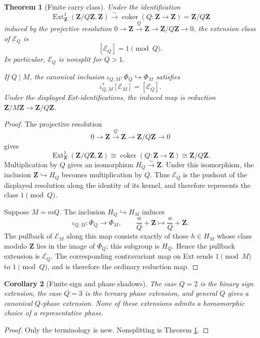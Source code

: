 \documentclass[11pt]{amsart}
\numberwithin{equation}{section}
\newtheorem{theorem}{Theorem}[section]
\newtheorem{corollary}[theorem]{Corollary}
\theoremstyle{definition}
\newcommand{\Z}{\mathbf Z}
\newcommand{\Ext}{\operatorname{Ext}}
\begin{document}
\begin{theorem}[Finite carry class]
\label{thm:finite-carry-class}
Under the identification
\[
\Ext^1_{\Z}(\Z/Q\Z,\Z)
\xrightarrow{\ \sim\ }
\operatorname{coker}(Q:\Z\to\Z)
=\Z/Q\Z
\]
induced by the projective resolution
$0\to\Z\xrightarrow{Q}\Z\to\Z/Q\Z\to0$,
the extension class of $\mathcal E_Q$ is
\[
[\mathcal E_Q]=1\pmod Q.
\]
In particular, $\mathcal E_Q$ is nonsplit for $Q>1$.

If $Q\mid M$, the canonical inclusion
$\iota_{Q,M}:\Phi_Q\hookrightarrow\Phi_M$ satisfies
\[
\iota_{Q,M}^{*}[\mathcal E_M]=[\mathcal E_Q].
\]
Under the displayed Ext-identifications, the induced map is reduction
$\Z/M\Z\to\Z/Q\Z$.
\end{theorem}

\begin{proof}
The projective resolution
\[
0\longrightarrow\Z\xrightarrow{\,Q\,}\Z
\longrightarrow\Z/Q\Z\longrightarrow0
\]
gives
\[
\Ext^1_{\Z}(\Z/Q\Z,\Z)
\cong\operatorname{coker}(Q:\Z\to\Z)
\cong\Z/Q\Z.
\]
Multiplication by $Q$ gives an isomorphism $H_Q\xrightarrow{\sim}\Z$.
Under this isomorphism, the inclusion $\Z\hookrightarrow H_Q$ becomes
multiplication by $Q$.  Thus $\mathcal E_Q$ is the pushout of the displayed
resolution along the identity of its kernel, and therefore represents the
class $1\pmod Q$.

Suppose $M=mQ$.  The inclusion $H_Q\hookrightarrow H_M$ induces
\[
\iota_{Q,M}:\Phi_Q\longrightarrow\Phi_M,
\qquad
\frac aQ+\Z\longmapsto\frac aQ+\Z.
\]
The pullback of $\mathcal E_M$ along this map consists exactly of those
$h\in H_M$ whose class modulo $\Z$ lies in the image of $\Phi_Q$; this
subgroup is $H_Q$.  Hence the pullback extension is $\mathcal E_Q$.
The corresponding contravariant map on Ext sends $1\pmod M$ to
$1\pmod Q$, and is therefore the ordinary reduction map.
\end{proof}

\begin{corollary}[Finite sign and phase shadows]
\label{cor:finite-phase-shadows}
The case $Q=2$ is the binary sign extension, the case $Q=3$ is the
ternary phase extension, and general $Q$ gives a canonical $Q$-phase
extension.  None of these extensions admits a homomorphic choice of a
representative phase.
\end{corollary}

\begin{proof}
Only the terminology is new.  Nonsplitting is Theorem
\ref{thm:finite-carry-class}.
\end{proof}
\end{document}
